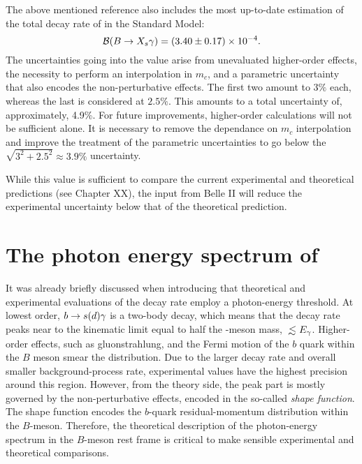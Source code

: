 The above mentioned reference also includes the most up-to-date estimation of the total decay rate of \BtoXsgamma in the Standard Model:
\begin{equation}
    \mathcal{B}({B\rightarrow X_{s} \gamma}) = (3.40\pm 0.17) \times 10^{-4}.
\end{equation}
The uncertainties going into the value arise from unevaluated higher-order effects, the necessity to perform an interpolation in $m_c$, and a parametric uncertainty that also encodes the non-perturbative effects.
The first two amount to $3\%$ each, whereas the last is considered at $2.5\%$. 
This amounts to a total uncertainty of, approximately, 4.9\%.
For future improvements, higher-order calculations will not be sufficient alone.
It is necessary to remove the dependance on $m_c$ interpolation and improve the treatment of the parametric uncertainties to go below the $\sqrt{3^2+2.5^2}\approx3.9\%$ uncertainty.

While this value is sufficient to compare the current experimental and theoretical predictions (see Chapter XX), the input from Belle II will reduce the experimental uncertainty below that of the theoretical prediction.


\section{The photon energy spectrum of \texorpdfstring{\BtoXsdgamma}{B->Xsg}}\label{eq:btosgamma_spectrum_theory}

It was already briefly discussed when introducing  that theoretical and experimental evaluations of the \BtoXsgamma decay rate employ a photon-energy threshold.
At lowest order, $b\rightarrow s(d) \gamma$ is a two-body decay, which means that the decay rate peaks near to the kinematic limit equal to half the \B-meson mass, $\lsim E_{\g}$.
Higher-order effects, such as gluonstrahlung, and the Fermi motion of the $b$ quark within the $B$ meson smear the distribution.
Due to the larger \BtoXsgamma decay rate and overall smaller background-process rate, experimental values have the highest precision around this region.
However, from the theory side, the peak part is mostly governed by the non-perturbative effects, encoded in the so-called \textit{shape function}.
The shape function encodes the $b$-quark residual-momentum distribution within the $B$-meson. 
Therefore, the theoretical description of the photon-energy spectrum in the $B$-meson rest frame is critical to make sensible experimental and theoretical comparisons.

